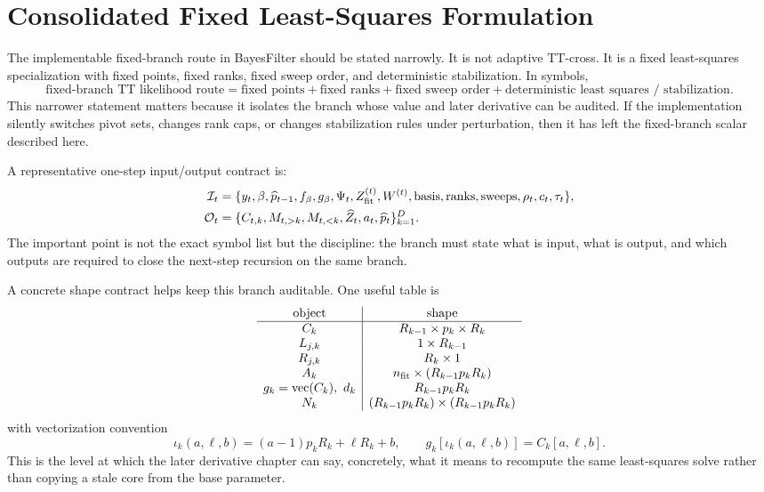 \section{Consolidated Fixed Least-Squares Formulation}
\label{sec:bf-hd-squared-tt-fixed-ls}

The implementable fixed-branch route in BayesFilter should be stated narrowly.
It is not adaptive TT-cross.  It is a fixed least-squares specialization with
fixed points, fixed ranks, fixed sweep order, and deterministic stabilization.
In symbols,
\begin{equation}
  \text{fixed-branch TT likelihood route}
  =
  \text{fixed points}
  +
  \text{fixed ranks}
  +
  \text{fixed sweep order}
  +
  \text{deterministic least squares / stabilization}.
  \label{eq:bf-hd-squared-tt-fixed-ls-summary}
\end{equation}
This narrower statement matters because it isolates the branch whose value and
later derivative can be audited.  If the implementation silently switches pivot
sets, changes rank caps, or changes stabilization rules under perturbation, then
it has left the fixed-branch scalar described here.

A representative one-step input/output contract is:
\begin{align}
  \mathcal I_t &=
  \{y_t,\beta,\widehat p_{t-1},f_\beta,g_\beta,\Psi_t,Z_{\rm fit}^{(t)},W^{(t)},
    \text{basis},\text{ranks},\text{sweeps},\rho_t,c_t,\tau_t\},
  \label{eq:bf-hd-squared-tt-inputs}\\
  \mathcal O_t &=
  \{C_{t,k},M_{t,>k},M_{t,<k},\widehat Z_t,a_t,\widehat p_t\}_{k=1}^D.
  \label{eq:bf-hd-squared-tt-outputs}
\end{align}
The important point is not the exact symbol list but the discipline: the branch
must state what is input, what is output, and which outputs are required to
close the next-step recursion on the same branch.

A concrete shape contract helps keep this branch auditable.  One useful table is
\begin{equation}
\begin{array}{c|c}
\text{object} & \text{shape}\\
\hline
C_k & R_{k-1}\times p_k\times R_k\\
L_{j,k} & 1\times R_{k-1}\\
R_{j,k} & R_k\times 1\\
A_k & n_{\rm fit}\times (R_{k-1}p_kR_k)\\
g_k=\operatorname{vec}(C_k),\ d_k & R_{k-1}p_kR_k\\
N_k & (R_{k-1}p_kR_k)\times (R_{k-1}p_kR_k)
\end{array}
  \label{eq:bf-hd-squared-tt-shape-table}
\end{equation}
with vectorization convention
\begin{equation}
  \iota_k(a,\ell,b)=
  (a-1)p_kR_k+\ell R_k+b,
  \qquad
  g_k[\iota_k(a,\ell,b)]=C_k[a,\ell,b].
  \label{eq:bf-hd-squared-tt-flattening}
\end{equation}
This is the level at which the later derivative chapter can say, concretely, what
it means to recompute the same least-squares solve rather than copying a stale
core from the base parameter.

